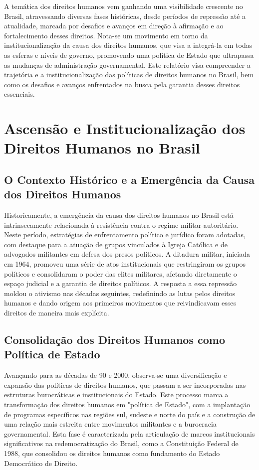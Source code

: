 \documentclass[
   article,       
   12pt,          
   oneside,       
   a4paper,       
   english,       
   brazil,        
   sumario=tradicional
   ]{abntex2}
\begin{document}
A temática dos direitos humanos vem ganhando uma visibilidade crescente no Brasil, atravessando diversas fases históricas, desde períodos de repressão até a atualidade, marcada por desafios e avanços em direção à afirmação e ao fortalecimento desses direitos. Nota-se um movimento em torno da institucionalização da causa dos direitos humanos, que visa a integrá-la em todas as esferas e níveis de governo, promovendo uma política de Estado que ultrapassa as mudanças de administração governamental. Este relatório visa compreender a trajetória e a institucionalização das políticas de direitos humanos no Brasil, bem como os desafios e avanços enfrentados na busca pela garantia desses direitos essenciais.

\section{Ascensão e Institucionalização dos Direitos Humanos no Brasil}

\subsection{O Contexto Histórico e a Emergência da Causa dos Direitos Humanos}

Historicamente, a emergência da causa dos direitos humanos no Brasil está intrinsecamente relacionada à resistência contra o regime militar-autoritário. Neste período, estratégias de enfrentamento político e jurídico foram adotadas, com destaque para a atuação de grupos vinculados à Igreja Católica e de advogados militantes em defesa dos presos políticos. A ditadura militar, iniciada em 1964, promoveu uma série de atos institucionais que restringiram os grupos políticos e consolidaram o poder das elites militares, afetando diretamente o espaço judicial e a garantia de direitos políticos. A resposta a essa repressão moldou o ativismo nas décadas seguintes, redefinindo as lutas pelos direitos humanos e dando origem aos primeiros movimentos que reivindicavam esses direitos de maneira mais explícita.

\subsection{Consolidação dos Direitos Humanos como Política de Estado}

Avançando para as décadas de 90 e 2000, observa-se uma diversificação e expansão das políticas de direitos humanos, que passam a ser incorporadas nas estruturas burocráticas e institucionais do Estado. Este processo marca a transformação dos direitos humanos em "política de Estado", com a implantação de programas específicos nas regiões sul, sudeste e norte do país e a construção de uma relação mais estreita entre movimentos militantes e a burocracia governamental. Esta fase é caracterizada pela articulação de marcos institucionais significativos na redemocratização do Brasil, como a Constituição Federal de 1988, que consolidou os direitos humanos como fundamento do Estado Democrático de Direito.
\end{document}
